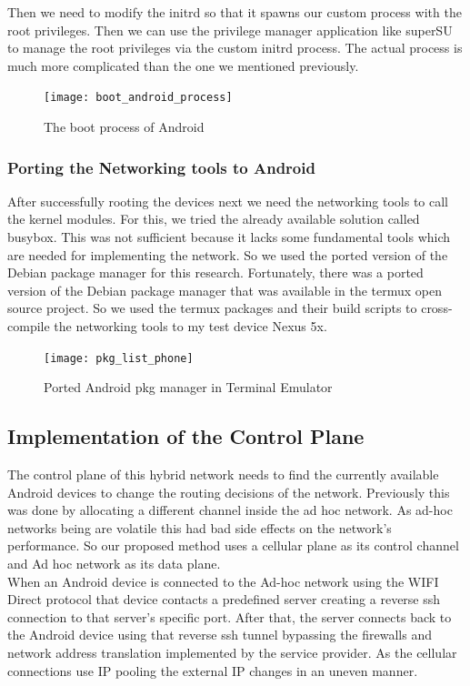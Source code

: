 Then we need to modify the initrd so that it spawns our custom process with the root privileges. Then we can use the privilege manager application like superSU to manage the root privileges via the custom initrd process. The actual process is much more complicated than the one we mentioned previously. 

\begin{figure}[H]
    \centering
    \texttt{[image: boot\_android\_process]}
    \caption{The boot process of Android}
    \label{fig:boot_android_process_d1212}
\end{figure}
\vspace{12pt}

\subsubsection{Porting the Networking tools to Android}

After successfully rooting the devices next we need the networking tools to call the kernel modules. For this, we tried the already available solution called busybox. This was not sufficient because it lacks some fundamental tools which are needed for implementing the network. So we used the ported version of the Debian package manager for this research. Fortunately, there was a ported version of the Debian package manager that was available in the termux\cite{termux} open source project. So we used the termux packages and their build scripts to cross-compile the networking tools to my test device Nexus 5x.
\begin{figure}[H]
    \centering
    \texttt{[image: pkg\_list\_phone]}
    \caption{Ported Android pkg manager in Terminal Emulator   }
    \label{fig:pkg_list_phone_12212}
\end{figure}
\vspace{12pt}

\subsection{Implementation of the Control Plane}
The control plane of this hybrid network needs to find the currently available Android devices to change the routing decisions of the network. Previously this was done by allocating a different channel inside the ad hoc network. As ad-hoc networks being are volatile this had bad side effects on the network’s performance. So our proposed method uses a cellular plane as its control channel and Ad hoc network as its data plane.
\\
When an Android device is connected to the Ad-hoc network using the WIFI Direct protocol that device contacts a predefined server creating a reverse ssh connection to that server’s specific port. After that, the server connects back to the Android device using that reverse ssh tunnel bypassing the firewalls and network address translation implemented by the service provider. As the cellular connections use IP pooling the external IP changes in an uneven manner.

